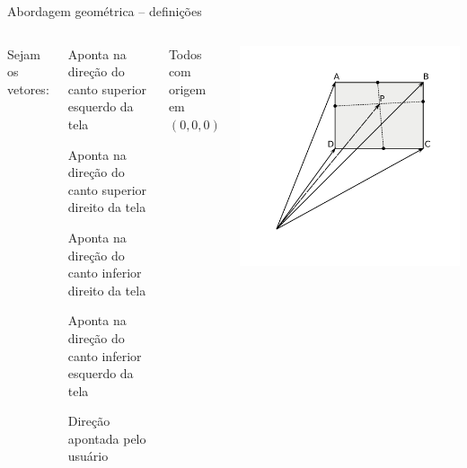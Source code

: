\documentclass{beamer}
\begin{document}
\begin{frame}{Abordagem geométrica -- definições}
	\begin{columns}
		\pause
		Sejam os vetores:
		\begin{description}[A]
		\item[A] Aponta na direção do canto superior esquerdo da tela
		\item[B] Aponta na direção do canto superior direito da tela
		\item[C] Aponta na direção do canto inferior direito da tela
		\item[D] Aponta na direção do canto inferior esquerdo da tela
		\item[P] Direção apontada pelo usuário
		\end{description}
		Todos com origem em $(0,0,0)$

		\includegraphics[keepaspectratio, width=1.0\textwidth, height=0.8\textheight, clip, trim=0.75in 0.75in 0.70in 0.50in]{../monografia/img/geometria_ABCD2.pdf}
	\end{columns}
\end{frame}
\end{document}
